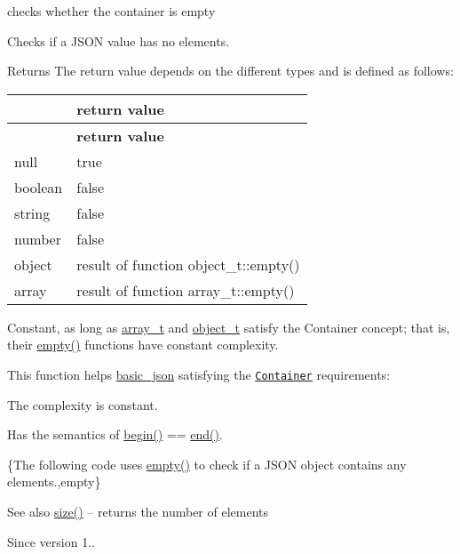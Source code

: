 checks whether the container is empty 

Checks if a J\+S\+ON value has no elements.

\begin{DoxyReturn}{Returns}
The return value depends on the different types and is defined as follows\+: \tabulinesep=1mm
\begin{longtabu} spread 0pt [c]{*2{|X[-1]}|}
\hline
{}&{\bf return value  }\\
\endfirsthead
\hline
\endfoot
\hline
{}&{\bf return value  }\\
\endhead
null &{\ttfamily true} \\
boolean &{\ttfamily false} \\
string &{\ttfamily false} \\
number &{\ttfamily false} \\
object &result of function {\ttfamily object\+\_\+t\+::empty()} \\
array &result of function {\ttfamily array\+\_\+t\+::empty()} \\
\end{longtabu}
Constant, as long as \hyperlink{a00025_ab00b882d39306d663c23dab110f5cae0}{array\+\_\+t} and \hyperlink{a00025_a0ac9894c9de8dc551cf2e5f1c605537f}{object\+\_\+t} satisfy the Container concept; that is, their {\ttfamily \hyperlink{a00025_a90239431815c94b0a334f7f4c55eb859}{empty()}} functions have constant complexity.
\end{DoxyReturn}
This function helps {\ttfamily \hyperlink{a00025}{basic\+\_\+json}} satisfying the \href{http://en.cppreference.com/w/cpp/concept/Container}{\tt Container} requirements\+:
\begin{DoxyItemize}
\item The complexity is constant.
\item Has the semantics of {\ttfamily \hyperlink{a00025_ad4e381c54039607be08d7af41a1f6ad1}{begin()} == \hyperlink{a00025_a12ccf14d39ddae52f6c7e126105a230b}{end()}}.
\end{DoxyItemize}

\{The following code uses {\ttfamily \hyperlink{a00025_a90239431815c94b0a334f7f4c55eb859}{empty()}} to check if a J\+S\+ON object contains any elements.,empty\}

\begin{DoxySeeAlso}{See also}
\hyperlink{a00025_a01833b332b68d9af1f7cd7a816c39e49}{size()} -- returns the number of elements
\end{DoxySeeAlso}
\begin{DoxySince}{Since}
version 1.. 
\end{DoxySince}
